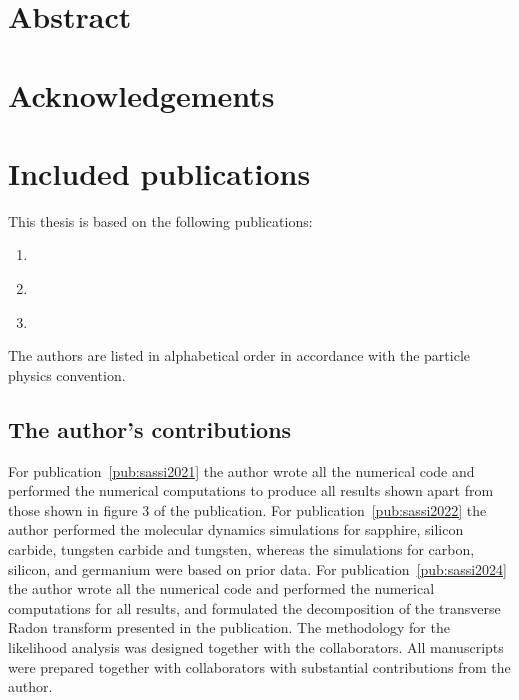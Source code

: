 \documentclass[b5paper, 10pt, twoside]{book}
\begin{document}

\tableofcontents

\chapter{Abstract}

\chapter{Acknowledgements}





\chapter{Included publications}

This thesis is based on the following publications:
\begin{enumerate}[label = \Roman*, ref = \Roman*]
    \item\label{pub:sassi2021} 
    \item\label{pub:sassi2022} 
    \item\label{pub:sassi2024} 
\end{enumerate}
The authors are listed in alphabetical order in accordance with the particle physics convention.

\section*{The author's contributions}

For publication~\ref{pub:sassi2021} the author wrote all the numerical code and performed the numerical computations to produce all results shown apart from those shown in figure 3 of the publication. For publication~\ref{pub:sassi2022} the author performed the molecular dynamics simulations for sapphire, silicon carbide, tungsten carbide and tungsten, whereas the simulations for carbon, silicon, and germanium were based on prior data. For publication~\ref{pub:sassi2024} the author wrote all the numerical code and performed the numerical computations for all results, and formulated the decomposition of the transverse Radon transform presented in the publication. The methodology for the likelihood analysis was designed together with the collaborators. All manuscripts were prepared together with collaborators with substantial contributions from the author.
\end{document}
